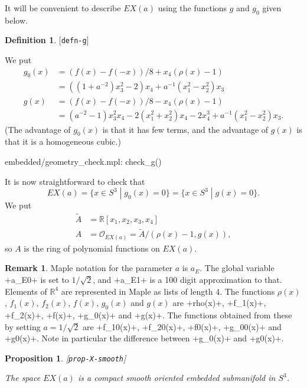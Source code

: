 \documentclass[reqno]{amsart}
\newcommand{\lbl}[1]{\label{#1}\textup{[\texttt{#1}]}\par}
\newcommand{\lbl}{\label}
\newcommand{\R}         {{\mathbb{R}}}
\newcommand{\st}        {\;|\;}
\newcommand{\rt}        {\sqrt{2}}
\newcommand{\tA}	{\widetilde{A}}
\newcommand{\CO}        {\mathcal{O}}
\renewcommand{\:}{\colon}
\newtheorem{proposition}[theorem]{Proposition}
\theoremstyle{definition}
\newtheorem{remark}[theorem]{Remark}
\newtheorem{definition}[theorem]{Definition}
\begin{document}
It will be convenient to describe $EX(a)$ using the functions $g$ and
$g_0$ given below.
\begin{definition}\lbl{defn-g}
 We put
 \begin{align*}
  g_0(x) &= (f(x)-f(-x))/8 + x_4(\rho(x)-1) \\
         &= ((1+a^{-2})x_3^2-2)x_4+a^{-1}(x_1^2-x_2^2)x_3 \\
  g(x) &= (f(x)-f(-x))/8 - x_4(\rho(x)-1) \\
       &= (a^{-2}-1)x_3^2x_4-2(x_1^2+x_2^2)x_4-2x_4^3+a^{-1}(x_1^2-x_2^2)x_3.
 \end{align*}
 (The advantage of $g_0(x)$ is that it has few terms, and the advantage
 of $g(x)$ is that it is a homogeneous cubic.)
 \begin{checks}
  embedded/geometry_check.mpl: check_g()
 \end{checks}

 It is now straightforward to check that
 \[ EX(a) = \{x\in S^3 \st g_0(x)=0\} = \{x\in S^3\st g(x)=0\}. \]
 We put
 \begin{align*}
  \tA &= \R[x_1,x_2,x_3,x_4] \\
  A   &= \CO_{EX(a)} = \tA/(\rho(x)-1,g(x)),
 \end{align*}
 so $A$ is the ring of polynomial functions on $EX(a)$.
\end{definition}
\begin{remark}
 Maple notation for the parameter $a$ is $a_E$.  The global variable
 \mcode+a_E0+ is set to $1/\rt$, and \mcode+a_E1+ is a 100 digit
 approximation to that.  Elements of $\R^4$ are represented in Maple
 as lists of length $4$.  The functions $\rho(x)$, $f_1(x)$, $f_2(x)$,
 $f(x)$, $g_0(x)$ and $g(x)$ are \mcode+rho(x)+, \mcode+f_1(x)+,
 \mcode+f_2(x)+, \mcode+f(x)+, \mcode+g_0(x)+ and \mcode+g(x)+.  The
 functions obtained from these by setting $a=1/\rt$ are \mcode+f_10(x)+,
 \mcode+f_20(x)+, \mcode+f0(x)+, \mcode+g_00(x)+ and \mcode+g0(x)+.
 Note in particular the difference between \mcode+g_0(x)+ and
 \mcode+g0(x)+.
\end{remark}

\begin{proposition}\lbl{prop-X-smooth}
 The space $EX(a)$ is a compact smooth oriented embedded submanifold in
 $S^3$.
\end{proposition}
\end{document}
